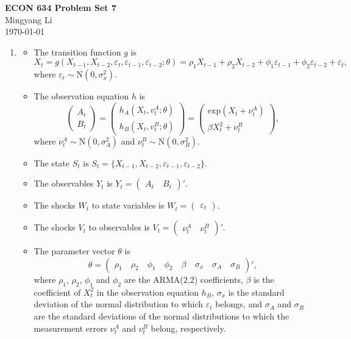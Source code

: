 \documentclass[12pt]{article}
\begin{document}
\begin{center}
\Large{\textbf{ECON 634 Problem Set 7}}\\[3mm]
\large{{Mingyang Li}}\\[1mm]
\today
\end{center}

\begin{enumerate}
\item 
\begin{itemize}
\item The transition function $g$ is $$X_t=g(X_{t-1},X_{t-2},\varepsilon_t,\varepsilon_{t-1},\varepsilon_{t-2};\theta)=\rho_1X_{t-1}+\rho_2X_{t-2}+\phi_1\varepsilon_{t-1}+\phi_2\varepsilon_{t-2}+\varepsilon_t,$$ where $\varepsilon_t\sim\text{N}(0,\sigma_x^2)$.
\item The observation equation $h$ is $$\begin{pmatrix}A_t\\B_t\end{pmatrix}=\begin{pmatrix}h_A(X_t,v_t^A;\theta)\\h_B(X_t,v_t^B;\theta)\end{pmatrix}=\begin{pmatrix}\text{exp}(X_t+\nu_t^A)\\\beta X_t^2+\nu_t^B\end{pmatrix},$$where $\nu_t^A\sim\text{N}(0,\sigma_A^2)$ and $\nu_t^B\sim\text{N}(0,\sigma_B^2)$.
\item The state $S_t$ is $S_t=\lbrace {X_{t-1},X_{t-2},\varepsilon_{t-1},\varepsilon_{t-2}}\rbrace$.
\item The observables $Y_t$ is $Y_t=\begin{pmatrix}A_t\quad B_t\end{pmatrix}'$.
\item The shocks $W_t$ to state variables is $W_t=\begin{pmatrix}\varepsilon_t\end{pmatrix}.$
\item The shocks $V_t$ to observables is $V_t=\begin{pmatrix}\nu_t^A\quad\nu_t^B\end{pmatrix}'.$
\item The parameter vector $\theta$ is $$\theta = \begin{pmatrix}\rho_1 \quad \rho_2 \quad \phi_1 \quad \phi_2 \quad \beta \quad \sigma_x \quad \sigma_A \quad \sigma_B\end{pmatrix}',$$ where $\rho_1$, $\rho_2$, $\phi_1$ and $\phi_2$ are the ARMA(2,2) coefficients, $\beta$ is the coefficient of $X_t^2$ in the observation equation $h_B$, $\sigma_x$ is the standard deviation of the normal distribution to which $\varepsilon_t$ belongs, and $\sigma_A$ and $\sigma_B$ are the standard deviations of the normal distributions to which the measurement errors $\nu_t^A$ and $\nu_t^B$ belong, respectively.

\end{itemize}
\end{enumerate}
\end{document}
